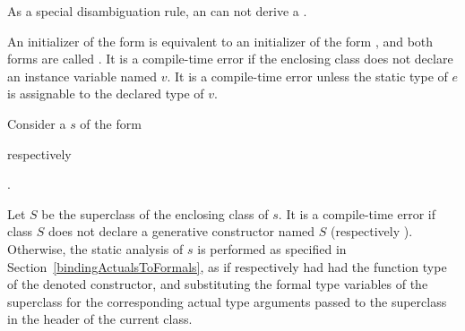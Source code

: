 \documentclass[makeidx]{article}
\begin{document}
\LMHash{}%
As a special disambiguation rule,
an  can not derive a .


\LMHash{}%
An initializer of the form  is equivalent to
an initializer of the form ,
and both forms are called .
It is a compile-time error if the enclosing class
does not declare an instance variable named $v$.
It is a compile-time error unless the static type of $e$
is assignable to the declared type of $v$.

\LMHash{}%
Consider a  $s$ of the form

\noindent
{}
respectively

\noindent
{}.

\noindent{}%
Let $S$ be the superclass of the enclosing class of $s$.
It is a compile-time error if class $S$ does not declare
a generative constructor named $S$ (respectively ).
Otherwise, the static analysis of $s$ is performed
as specified in Section~\ref{bindingActualsToFormals},
as if \code{\SUPER} respectively 
had had the function type of the denoted constructor,
and substituting the formal type variables of the superclass
for the corresponding actual type arguments passed to the superclass
in the header of the current class.
\end{document}
